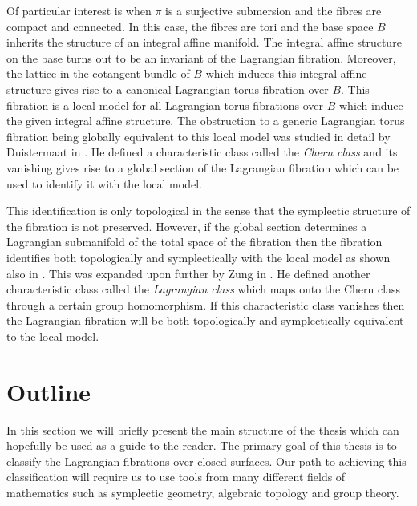 Of particular interest is when $\pi$ is a surjective submersion and the fibres
are compact and connected. In this case, the fibres are tori and the base space
$B$ inherits the structure of an integral affine manifold. The integral affine
structure on the base turns out to be an invariant of the Lagrangian fibration.
Moreover, the lattice in the cotangent bundle of $B$ which induces this
integral affine structure gives rise to a canonical Lagrangian torus fibration
over $B$. This fibration is a local model for all Lagrangian torus fibrations
over $B$ which induce the given integral affine structure. The obstruction to a
generic Lagrangian torus fibration being globally equivalent to this local
model was studied in detail by Duistermaat in \cite{ActionAngle}. He defined a
characteristic class called the \emph{Chern class} and its vanishing gives rise
to a global section of the Lagrangian fibration which can be used to identify
it with the local model.

This identification is only topological in the sense that the symplectic
structure of the fibration is not preserved. However, if the global section
determines a Lagrangian submanifold of the total space of the fibration then
the fibration identifies both topologically and symplectically with the local
model as shown also in \cite{ActionAngle}. This was expanded upon further by
Zung in \cite{zung2001symplectictopologyintegrablehamiltonian}. He defined
another characteristic class called the \emph{Lagrangian class} which maps onto
the Chern class through a certain group homomorphism. If this characteristic
class vanishes then the Lagrangian fibration will be both topologically and
symplectically equivalent to the local model. \newpage

\section*{Outline}

In this section we will briefly present the main structure of the thesis which
can hopefully be used as a guide to the reader. The primary goal of this thesis
is to classify the Lagrangian fibrations over closed surfaces. Our path to
achieving this classification will require us to use tools from many different
fields of mathematics such as symplectic geometry, algebraic topology and group
theory.

